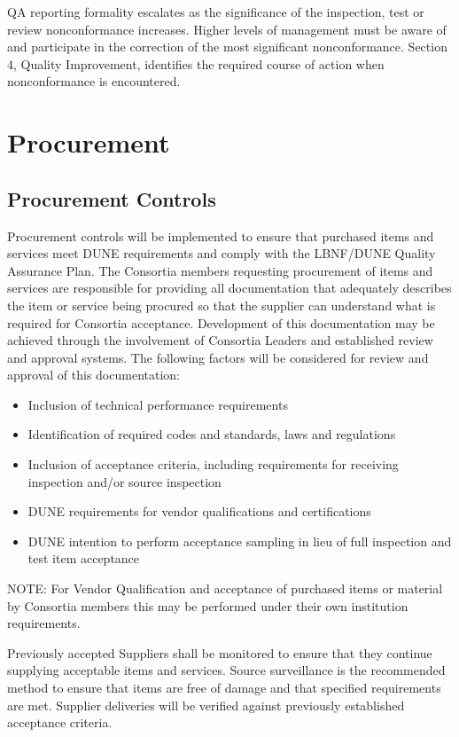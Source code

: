 QA reporting formality escalates as the significance of the
inspection, test or review nonconformance increases. Higher levels of
management must be aware of and participate in the correction of the
most significant nonconformance. Section 4, Quality Improvement,
identifies the required course of action when nonconformance is
encountered.

\section{Procurement}

\subsection{Procurement Controls}

Procurement controls will be implemented to ensure that purchased
items and services meet DUNE requirements and comply with the
LBNF/DUNE Quality Assurance Plan.  The Consortia members requesting
procurement of items and services are responsible for providing all
documentation that adequately describes the item or service being
procured so that the supplier can understand what is required for
Consortia acceptance. Development of this documentation may be
achieved through the involvement of Consortia Leaders and established
review and approval systems. The following factors will be considered
for review and approval of this documentation:
\begin{itemize}
 \item Inclusion of technical performance requirements
 \item Identification of required codes and standards, laws and regulations
 \item Inclusion of acceptance criteria, including requirements for receiving inspection and/or source inspection
 \item DUNE requirements for vendor qualifications and certifications
 \item DUNE intention to perform acceptance sampling in lieu of full inspection and test item acceptance
\end{itemize}
NOTE: For Vendor Qualification and acceptance of purchased items or
material by Consortia members this may be performed under their own
institution requirements.

Previously accepted Suppliers shall be monitored to ensure that they
continue supplying acceptable items and services. Source surveillance
is the recommended method to ensure that items are free of damage and
that specified requirements are met. Supplier deliveries will be
verified against previously established acceptance criteria.

